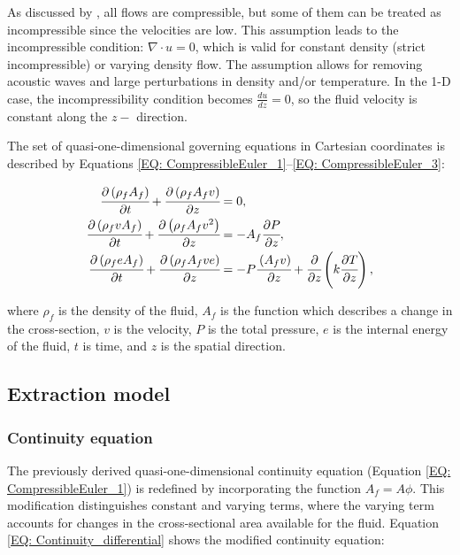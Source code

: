 \documentclass[a4paper,fleqn]{cas-dc}
\begin{document}
	As discussed by \citet{Anderson2023}, all flows are compressible, but some of them can be treated as incompressible since the velocities are low. This assumption leads to the incompressible condition: $\nabla \cdot u =0$, which is valid for constant density (strict incompressible) or varying density flow. The assumption allows for removing acoustic waves and large perturbations in density and/or temperature. In the 1-D case, the incompressibility condition becomes $\frac{du}{dz} = 0$, so the fluid velocity is constant along the $z-$ direction.
	
	The set of quasi-one-dimensional governing equations in Cartesian coordinates is described by Equations \ref{EQ: CompressibleEuler_1}--\ref{EQ: CompressibleEuler_3}:
	
	{\footnotesize
		\begin{align}
			\label{EQ: CompressibleEuler_1}
			\cfrac{\partial \left( \rho_f A_f \right) }{\partial t} + \cfrac{\partial \left( \rho_f A_f v \right)}{\partial z} &= 0, \\
			\cfrac{\partial \left( \rho_f v A_f \right) }{\partial t} + \cfrac{\partial \left( \rho_f A_f v^2 \right)}{\partial z} &= -A_f \cfrac{\partial P}{\partial z} \label{EQ: CompressibleEuler_2}, \\
			\cfrac{\partial \left( \rho_f e A_f \right) }{\partial t} + \cfrac{\partial \left( \rho_f A_f v e\right)}{\partial z} &= -P\cfrac{\left( A_f v \right)}{\partial z} + \cfrac{\partial}{\partial z} \left( k \cfrac{\partial T}{\partial z} \right),   
			\label{EQ: CompressibleEuler_3}
		\end{align}  
	}
	
	where $\rho_f$ is the density of the fluid, $A_f$ is the function which describes a change in the cross-section, $v$ is the velocity, $P$ is the total pressure, $e$ is the internal energy of the fluid, $t$ is time, and $z$ is the spatial direction.
	
	\subsection{Extraction model} \label{CH: Extraction_model}
	\subsubsection{Continuity equation} \label{CH: Continuity}
	
	The previously derived quasi-one-dimensional continuity equation (Equation \ref{EQ: CompressibleEuler_1}) is redefined by incorporating the function $A_f = A\phi$. This modification distinguishes constant and varying terms, where the varying term accounts for changes in the cross-sectional area available for the fluid. Equation \ref{EQ: Continuity_differential} shows the modified continuity equation:
	
\end{document}

